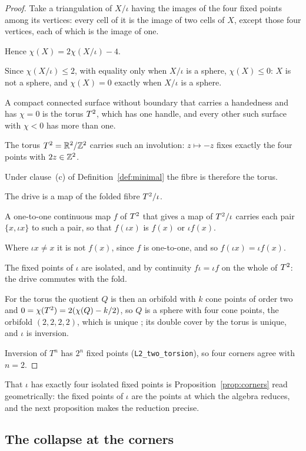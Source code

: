 \documentclass[11pt,a4paper]{article}
\theoremstyle{plain}
\theoremstyle{definition}
\theoremstyle{remark}
\begin{document}
\begin{proof}
Take a triangulation of $X/\iota$ having the images of the four fixed points among its vertices: every cell of it is the image of two cells of $X$, except those four vertices, each of which is the image of one.

Hence $\chi(X)=2\chi(X/\iota)-4$.

Since $\chi(X/\iota)\le2$, with equality only when $X/\iota$ is a sphere, $\chi(X)\le0$: $X$ is not a sphere, and $\chi(X)=0$ exactly when $X/\iota$ is a sphere.

A compact connected surface without boundary that carries a handedness and has $\chi=0$ is the torus $T^2$, which has one handle, and every other such surface with $\chi<0$ has more than one.

The torus $T^2=\mathbb{R}^{2}/\mathbb{Z}^{2}$ carries such an involution: $z\mapsto-z$ fixes exactly the four points with $2z\in\mathbb{Z}^{2}$.

Under clause~(c) of Definition~\ref{def:minimal} the fibre is therefore the torus.

The drive is a map of the folded fibre $T^2/\iota$.

A one-to-one continuous map $f$ of $T^2$ that gives a map of $T^2/\iota$ carries each pair $\{x,\iota x\}$ to such a pair, so that $f(\iota x)$ is $f(x)$ or $\iota f(x)$.

Where $\iota x\neq x$ it is not $f(x)$, since $f$ is one-to-one, and so $f(\iota x)=\iota f(x)$.

The fixed points of $\iota$ are isolated, and by continuity $f\iota=\iota f$ on the whole of $T^2$: the drive commutes with the fold.

For the torus the quotient $Q$ is then an orbifold with $k$ cone points of order two and $0=\chi(T^2)=2(\chi(Q)-k/2)$, so $Q$ is a sphere with four cone points, the orbifold $(2,2,2,2)$, which is unique \cite{Thurston}; its double cover by the torus is unique, and $\iota$ is inversion.

Inversion of $T^{n}$ has $2^{n}$ fixed points (\texttt{L2\_two\_torsion}), so four corners agree with $n=2$.
\end{proof}

That $\iota$ has exactly four isolated fixed points is Proposition~\ref{prop:corners} read geometrically: the fixed points of $\iota$ are the points at which the algebra reduces, and the next proposition makes the reduction precise.

\subsection{The collapse at the corners}
\end{document}
